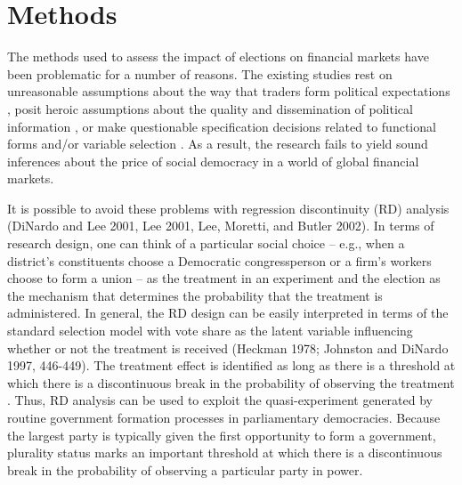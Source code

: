 \documentclass[12pt]{article}
\begin{document}
\section{Methods}


The methods used to assess the impact of elections on financial markets have been problematic for a number of reasons. The existing studies rest on unreasonable assumptions about the way that traders form political expectations \citep{Alesina1997}, posit heroic assumptions about the quality and dissemination of political information \citep{Herron2000}, or make questionable specification decisions related to functional forms and/or variable selection \citep{Garrett1998, Mosley2000}. As a result, the research fails to yield sound inferences about the price of social democracy in a world of global financial markets. 

It is possible to avoid these problems with regression discontinuity (RD) analysis (DiNardo and Lee 2001, Lee 2001, Lee, Moretti, and Butler 2002). In terms of research design, one can think of a particular social choice -- e.g., when a district's constituents choose a Democratic congressperson or a firm's workers choose to form a union -- as the treatment in an experiment and the election as the mechanism that determines the probability that the treatment is administered. In general, the RD design can be easily interpreted in terms of the standard selection model with vote share as the latent variable influencing whether or not the treatment is received (Heckman 1978; Johnston and DiNardo 1997, 446-449). The treatment effect is identified as long as there is a threshold at which there is a discontinuous break in the probability of observing the treatment \citep{Hahn2001}. Thus, RD analysis can be used to exploit the quasi-experiment generated by routine government formation processes in parliamentary democracies. Because the largest party is typically given the first opportunity to form a government, plurality status marks an important threshold at which there is a discontinuous break in the probability of observing a particular party in power. 
\end{document}
